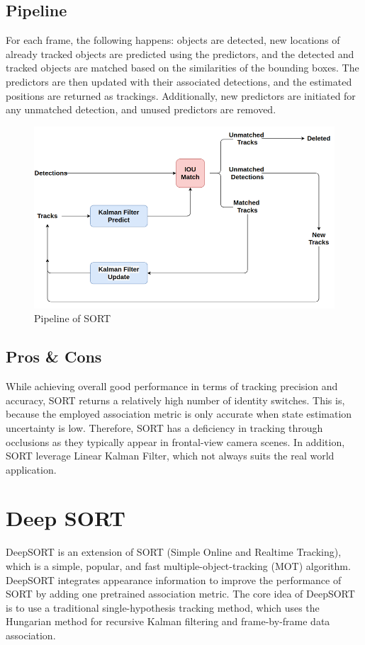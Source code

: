     \subsection{Pipeline}
        For each frame, the following happens: objects are detected, new locations of already tracked objects are predicted using the predictors, and the detected and tracked objects are matched based on the similarities of the bounding boxes. The predictors are then updated with their associated detections, 
        and the estimated positions are returned as trackings. Additionally, new predictors are initiated for any unmatched detection, and unused predictors are removed.
        \begin{figure}[H]
            \centering
            \includegraphics[width=0.6\linewidth]{img/SORT.png}
            \caption{Pipeline of SORT}
        \end{figure}
    \subsection{Pros \& Cons}
        While achieving overall good performance in terms of tracking precision and accuracy, SORT returns a relatively high number of identity switches. This is, because the employed association metric is only accurate when state estimation uncertainty is low. Therefore, SORT has a deficiency in tracking through 
        occlusions as they typically appear in frontal-view camera scenes. In addition, SORT leverage Linear Kalman Filter, which not always suits the real world application.

\section{Deep SORT}
    DeepSORT is an extension of SORT (Simple Online and Realtime Tracking), which is a simple, popular, and fast multiple-object-tracking (MOT) algorithm. DeepSORT integrates appearance information to improve the performance of SORT by adding one pretrained association metric. The core idea of DeepSORT is to use a 
    traditional single-hypothesis tracking method, which uses the Hungarian method for recursive Kalman filtering and frame-by-frame data association.
